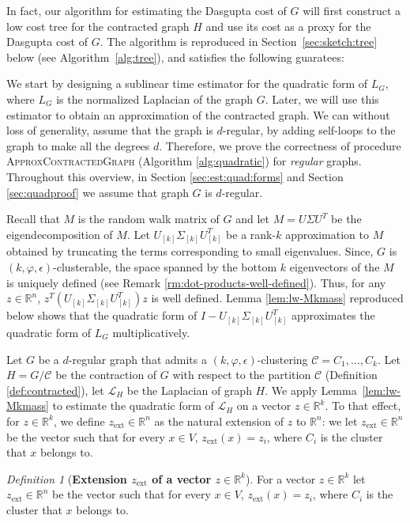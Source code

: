 \documentclass[letterpaper,11pt]{article}
\newcommand{\zext}{z_{\text{ext}}}
\newcommand{\cC}{\mathcal{C}}
\newcommand{\R}{\mathbb{R}}
\theoremstyle{plain}
\theoremstyle{definition}
\theoremstyle{remark}
\newtheorem{mydef}{Definition}
\newcommand{\e}{\epsilon}
\begin{document}


In fact, our algorithm for estimating the Dasgupta cost of $G$ will first construct a low cost tree for the contracted graph $H$ and use its cost as a proxy for the Dasgupta cost of $G$.  The algorithm is reproduced in Section~\ref{sec:sketch:tree} below (see Algorithm~\ref{alg:tree}), and satisfies the following guaratees:


\thmestdcost*


We start by designing a sublinear time estimator for the quadratic form of $L_G$, where $L_G$ is the normalized Laplacian of the graph $G$. Later, we will use this estimator to obtain an approximation of the contracted graph. We can without loss of generality, assume that the graph is $d$-regular, by adding self-loops to the graph to make all the degrees $d$. 
Therefore, we prove the correctness of procedure \textsc{ApproxContractedGraph} (Algorithm \ref{alg:quadratic}) for {\em regular} graphs. Throughout this overview, in Section \ref{sec:est:quad:forms} and Section \ref{sec:quadproof} we assume that graph $G$ is $d$-regular. 

Recall that  $M$  is the random walk matrix of $G$ and let $M = U \Sigma U^T$ be the eigendecomposition of $M$. Let $U_{[k]}\Sigma_{[k]} U_{[k]}^T $ be a rank-$k$ approximation to $M$ obtained by truncating the terms corresponding to small eigenvalues. Since, $G$ is $(k, \varphi, \e)$-clusterable, the space spanned by the bottom $k$ eigenvectors of the $M$ is uniquely defined (see Remark \ref{rm:dot-products-well-defined}).
Thus, for any $z \in \R^n$,  $z^T (U_{[k]} \Sigma_{[k]} U_{[k]}^T) z$ is well defined. Lemma \ref{lem:lw-Mkmass} reproduced below shows that the quadratic form of $I - U_{[k]}\Sigma_{[k]} U_{[k]}^T$ approximates the quadratic form of $L_G$ multiplicatively.
\quadraticformlemma*

Let $G$ be a $d$-regular graph that admits a $(k,\varphi,\epsilon)$-clustering $\cC=C_1, \ldots , C_k$. Let $H = G/\cC$ be the contraction of $G$ with respect to the partition $\cC $ (Definition \ref{def:contracted}), let $\mathcal{L}_H$ be the Laplacian of graph $H$. We apply Lemma~\ref{lem:lw-Mkmass} to estimate the quadratic form of $\mathcal{L}_H$ on a vector $z\in \R^k$. To that effect, for $z \in \R^k$, we define $\zext \in \R^n$ as the natural extension of $z$ to $\R^n$: we let $\zext\in \R^n$ be the vector such that for every $x\in V$,  $\zext(x) = z_i$, where $C_i$ is the cluster that $x$ belongs to.  

\begin{mydef}[\textbf{Extension $\zext$ of a vector $z\in \R^k$}]\label{def:ext}
For a vector $z\in \R^k$ let $\zext\in \R^n$ be the vector such that for every $x\in V$,  $\zext(x) = z_i$, where $C_i$ is the cluster that $x$ belongs to.
\end{mydef}
\end{document}
